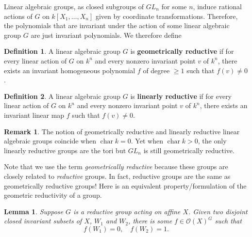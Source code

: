 \documentclass[12pt]{article}
\newtheorem{lemma}{Lemma}[section]
\theoremstyle{remark}
\theoremstyle{definition}
\newtheorem{remark}{Remark}[section]
\newtheorem{definition}{Definition}[section]
\begin{document}
    Linear algebraic groups, as closed subgroups of $GL_n$ for some $n$, induce rational actions of $G$ on $k[X_1,\dots, X_n]$ given by coordinate transformations. Therefore, the polynomials that are invariant under the action of some linear algebraic group $G$ are just invariant polynomials. We therefore define
    \begin{definition}
        A linear algebraic group $G$ is \textbf{geometrically reductive} if for every linear action of $G$ on $k^n$ and every nonzero invariant point $v$ of $k^n$, there exists an invariant homogeneous polynomial $f$ of degree $\geqslant 1$ such that $f(v)\neq 0$.
    \end{definition}
    \begin{definition}
        A linear algebraic group $G$ is \textbf{linearly reductive} if for every linear action of $G$ on $k^n$ and every nonzero invariant point $v$ of $k^n$, there exists an invariant linear map $f$ such that $f(v)\neq 0$.
    \end{definition}
    \begin{remark}
        The notion of geometrically reductive and linearly reductive linear algebraic groups coincide when $\operatorname{char} k=0$. Yet when $\operatorname{char} k>0$, the only linearly reductive groups are the tori but $GL_n$ is still geometrically reductive.
    \end{remark}
    Note that we use the term \textit{geometrically reductive} because these groups are closely related to \textit{reductive} groups. In fact, reductive groups are the same as geometrically reductive groups! Here is an equivalent property/formulation of the geometric reductivity of a group.
    \begin{lemma}
        Suppose $G$ is a reductive group acting on affine $X$. Given two disjoint closed invariant subsets of $X$, $W_1$ and $W_2$, there is some $f\in \mathcal O(X)^G$ such that
        \[f(W_1)=0,\quad f(W_2)=1.\]
    \end{lemma}
\end{document}
